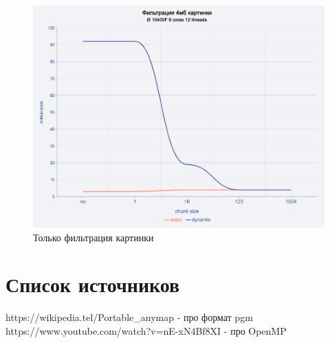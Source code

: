 \documentclass{article}
\begin{document}
  \begin{figure}[H]
	\includegraphics[width=1\textwidth]{pictures/Screenshot_5.png}
	\caption{Только фильтрация картинки}
  \end{figure}
\section{Список источников}
https://wikipedia.tel/Portable\_anymap - про формат pgm\\
https://www.youtube.com/watch?v=nE-xN4Bf8XI - про OpenMP
\end{document}
